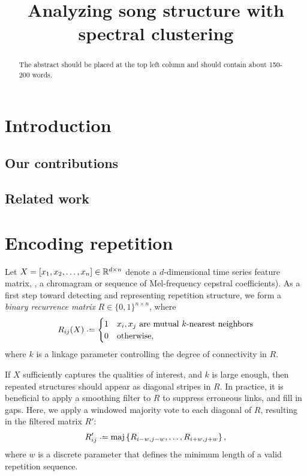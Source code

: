 \documentclass{article}
\title{Analyzing song structure with spectral clustering}
\begin{document}
%
\maketitle
%
\begin{abstract}
The abstract should be placed at the top left column and should contain about 150-200 words.
\end{abstract}
%
\section{Introduction}\label{sec:introduction}

\subsection{Our contributions}

\subsection{Related work}

\cite{mauch2009using}

\cite{serra2012unsupervised}

\cite{grohganz2013converting}

\section{Encoding repetition}

Let $X = [x_1, x_2, \dots, x_n] \in \mathbb{R}^{d\times n}$ denote a $d$-dimensional time
series feature matrix, \eg, a chromagram or sequence of Mel-frequency cepstral 
coefficients).  As a first step toward detecting and representing repetition structure, 
we form a \emph{binary recurrence matrix} $R \in \{0,1\}^{n\times n}$, where 
\begin{equation}
R_{ij}(X) \defeq \begin{cases}
1 & x_i, x_j \text{ are mutual $k$-nearest neighbors}\\
0 & \text{otherwise},
\end{cases}
\end{equation}
where $k$ is a linkage parameter controlling the degree of connectivity in $R$.


If $X$ sufficiently captures the qualities of interest, and $k$ is large
enough, then repeated structures should appear as diagonal stripes in $R$.
In practice, it is beneficial to apply a smoothing filter to $R$ to suppress erroneous
links, and fill in gaps.  Here, we apply a windowed majority vote to each diagonal of
$R$, resulting in the filtered matrix $R'$:
\begin{equation}
R'_{ij} \defeq \maj\left\{ R_{i-w, j-w}, \dots, R_{i+w, j+w}\right\},
\label{filtered-rep}
\end{equation}
where $w$ is a discrete parameter that defines the minimum length of a valid
repetition sequence.
\end{document}
